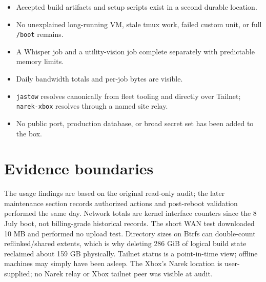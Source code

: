 \documentclass[11pt,letterpaper]{article}
\newcommand{\mono}[1]{\texttt{#1}}
\begin{document}
\begin{itemize}
  \item Accepted build artifacts and setup scripts exist in a second durable location.
  \item No unexplained long-running VM, stale tmux work, failed custom unit, or full \mono{/boot} remains.
  \item A Whisper job and a utility-vision job complete separately with predictable memory limits.
  \item Daily bandwidth totals and per-job bytes are visible.
  \item \mono{jastow} resolves canonically from fleet tooling and directly over Tailnet; \mono{narek-xbox} resolves through a named site relay.
  \item No public port, production database, or broad secret set has been added to the box.
\end{itemize}

\section{Evidence boundaries}

The usage findings are based on the original read-only audit; the later maintenance section records authorized actions and post-reboot validation performed the same day. Network totals are kernel interface counters since the 8 July boot, not billing-grade historical records. The short WAN test downloaded 10 MB and performed no upload test. Directory sizes on Btrfs can double-count reflinked/shared extents, which is why deleting 286 GiB of logical build state reclaimed about 159 GB physically. Tailnet status is a point-in-time view; offline machines may simply have been asleep. The Xbox's Narek location is user-supplied; no Narek relay or Xbox tailnet peer was visible at audit.

\endgroup
\end{document}
